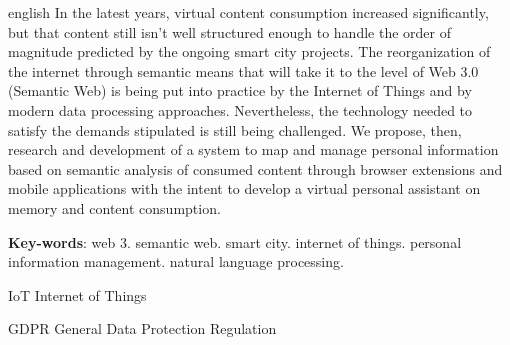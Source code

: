\documentclass[
	12pt,				%
	openright,			%
	twoside,			%
	a4paper,			%
	english,			%
	french,				%
	spanish,			%
	brazil				%
	]{abntex2}
\begin{document}
\begin{resumo}[Abstract]
 \begin{otherlanguage*}{english}
   In the latest years, virtual content consumption increased significantly, but that content still isn't well structured enough to handle the order of magnitude predicted by the ongoing smart city projects. The reorganization of the internet through semantic means that will take it to the level of Web 3.0 (Semantic Web) is being put into practice by the Internet of Things and by modern data processing approaches. Nevertheless, the technology needed to satisfy the demands stipulated is still being challenged. We propose, then, research and development of a system to map and manage personal information based on semantic analysis of consumed content through browser extensions and mobile applications with the intent to develop a virtual personal assistant on memory and content consumption.

   \vspace{\onelineskip}
 
   \noindent 
   \textbf{Key-words}: web 3. semantic web. smart city. internet of things. personal information management. natural language processing.
 \end{otherlanguage*}
\end{resumo}

\listoffigures*
\cleardoublepage

\listoftables*
\cleardoublepage

\begin{siglas}
  \item[IoT] Internet of Things
  \item[GDPR] General Data Protection Regulation
\end{siglas}

\tableofcontents*
\cleardoublepage



\textual

\end{document}
